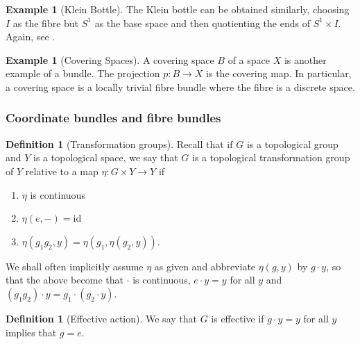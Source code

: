 \documentclass[reqno]{amsart}
\theoremstyle{definition}
\newtheorem{definition}[theorem]{Definition}
\newtheorem{example}[theorem]{Example}
\theoremstyle{remark}
\newcommand{\id}{{\mathrm{id}}}
\begin{document}
\begin{example}[Klein Bottle]
    The Klein bottle can be obtained similarly, choosing
    $I$ as the fibre but $S^{1}$ as the base space and then
    quotienting the ends of $S^{1} \times I$. Again, see
    \cite[p. 4]{Steenrod}.
\end{example}

\begin{example}[Covering Spaces]
    A covering space $B$ of a space $X$ is another example
    of a bundle. The projection
    $p \colon B \to X$ is the covering map.
    In particular, a covering space is a
    locally trivial fibre bundle where the fibre is a discrete
    space.\\
\end{example}

\subsubsection{Coordinate bundles and fibre bundles}

\begin{definition}[Transformation groups]
    Recall that if $G$ is a topological group and
    $Y$ is a topological space, we say that
    $G$ is a topological transformation group of $Y$ relative
    to a map $\eta \colon G \times Y \to Y$ if
    \begin{enumerate}
        \item $\eta$ is continuous
        \item $\eta (e,-) = \id$ 
        \item $\eta \left( g_1g_2,y \right) 
            = \eta \left( g_1, \eta(g_2,y) \right) $.
    \end{enumerate}
    We shall often implicitly assume $\eta$ as given and
    abbreviate $\eta (g,y)$ by $g\cdot y$, so that the above
    become that $\cdot $ is continuous,
    $e\cdot y =y$ for all $y$ and
    $\left( g_1g_2 \right) \cdot y = g_1\cdot \left( g_2\cdot y
    \right) $.
\end{definition}

\begin{definition}[Effective action]
    We say that $G$ is effective if
    $g \cdot y = y$ for all $y$ implies that
    $g = e$.
\end{definition}
\end{document}
